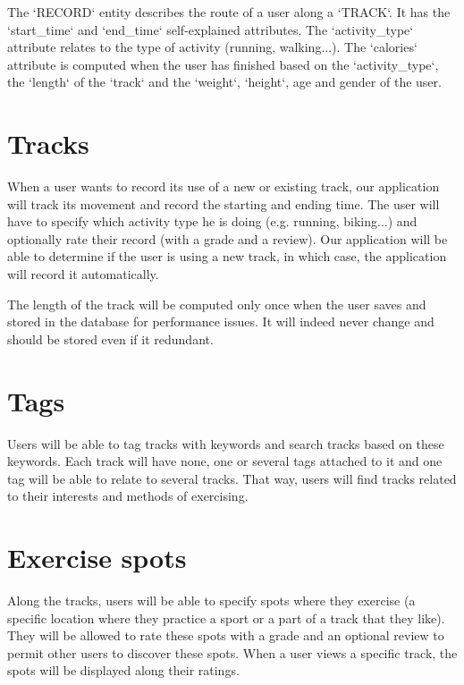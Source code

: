 \documentclass[a4paper]{article}
\begin{document}
The `RECORD` entity describes the route of a user along a `TRACK`. It has the `start\_time` and `end\_time` self-explained attributes. The `activity\_type` attribute relates to the type of activity (running, walking...). The `calories` attribute is computed when the user has finished based on the `activity\_type`, the `length` of the `track` and the `weight`, `height`, age and gender of the user.

\section{Tracks}

When a user wants to record its use of a new or existing track, our application will track its movement and record the starting and ending time. The user will have to specify which activity type he is doing (e.g. running, biking...) and optionally rate their record (with a grade and a review). Our application will be able to determine if the user is using a new track, in which case, the application will record it automatically.

The length of the track will be computed only once when the user saves and stored in the database for performance issues. It will indeed never change and should be stored even if it redundant.

\section{Tags}

Users will be able to tag tracks with keywords and search tracks based on these keywords. Each track will have none, one or several tags attached to it and one tag will be able to relate to several tracks. That way, users will find tracks related to their interests and methods of exercising.

\section{Exercise spots}

Along the tracks, users will be able to specify spots where they exercise (a specific location where they practice a sport or a part of a track that they like). They will be allowed to rate these spots with a grade and an optional review to permit other users to discover these spots.
When a user views a specific track, the spots will be displayed along their ratings.
\end{document}
